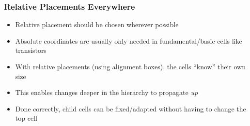 \documentclass[aspectratio=169, dvipsnames, x11names, svgnames, 11pt]{beamer}
\begin{document}
\begin{frame}
    \frametitle{Relative Placements Everywhere}
    \begin{itemize}
        \item Relative placement should be chosen wherever possible
        \item Absolute coordinates are usually only needed in fundamental/basic cells like transistors
        \item With relative placements (using alignment boxes), the cells \enquote{know} their own size
        \item This enables changes deeper in the hierarchy to propagate \emph{up}
        \item Done correctly, child cells can be fixed/adapted without having to change the top cell
    \end{itemize}
\end{frame}
\end{document}
